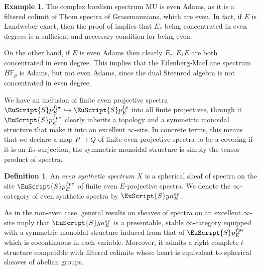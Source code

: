 \documentclass[oneside,a4paper]{amsart}
\newcommand{\euscr}[1]{\EuScript{#1}} %
\newcommand{\MU}{\mathrm{MU}} %
\newcommand{\spectra}{\euscr{S}p} %
\newcommand{\synspectra}{\euscr{S}yn} %
\theoremstyle{plain}
\theoremstyle{definition}
\newtheorem{example}[thm]{Example}
\newtheorem{defin}[thm]{Definition}
\theoremstyle{remark}
\begin{document}
\begin{example}
\label{example:conditions_for_being_even_adams}
The complex bordism spectrum $\MU$ is even Adams, as it is a filtered colimit of Thom spectra of Grassmannians, which are even. In fact, if $E$ is Landweber exact, then the proof of \cite[1.4.9]{hovey2003homotopy} implies that $E_{*}$ being concentrated in even degrees is a sufficient and necessary condition for being even. 

On the other hand, if $E$ is even Adams then clearly $E_{*}, E_{*}E$ are both concentrated in even degree. This implies that the Eilenberg-MacLane spectrum $H \mathbb{F}_{p}$ is Adams, but not even Adams, since the dual Steenrod algebra is not concentrated in even degree.
\end{example}

We have an inclusion of finite even projective spectra $\spectra_{E}^{fpe} \hookrightarrow \spectra_{E}^{fp}$ into all finite projectives, through it $\spectra_{E}^{fpe}$ clearly inherits a topology and a symmetric monoidal structure that make it into an excellent $\infty$-site. In concrete terms, this means that we declare a map $P \rightarrow Q$ of finite even projective spectra to be a covering if it is an $E_{*}$-surjection, the symmetric monoidal structure is simply the tensor product of spectra. 

\begin{defin}
\label{defin:even_synthetic_spectrum}
An \emph{even synthetic spectrum} $X$ is a spherical sheaf of spectra on the site $\spectra_{E}^{fpe}$ of finite even $E$-projective spectra. We denote the $\infty$-category of even synthetic spectra by $\synspectra_{E}^{ev}$.
\end{defin}
As in the non-even case, general results on sheaves of spectra on an excellent $\infty$-site imply that $\synspectra_{E}^{ev}$ is a presentable, stable $\infty$-category equipped with a symmetric monoidal structure induced from that of $\spectra_{E}^{fpe}$ which is cocontinuous in each variable. Moreover, it admits a right complete $t$-structure compatible with filtered colimits whose heart is equivalent to spherical sheaves of abelian groups. 
\end{document}
